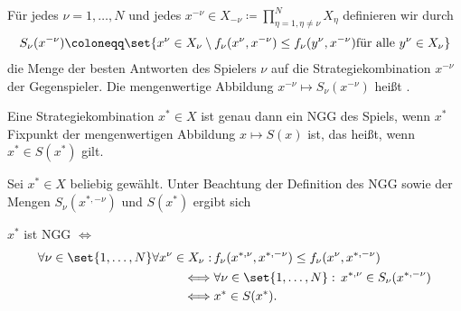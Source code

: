 \begin{definition}
  Für jedes $\nu = 1, \dots, N$ und jedes $x^{-\nu} \in X_{-\nu}\coloneqq \prod_{\eta = 1, \eta \neq \nu}^{N} X_{\eta}$ definieren wir durch
  \begin{align*}
    S_{\nu}(x^{-\nu}) \coloneqq \set{x^{\nu}\in X_{\nu}\setminus f_{\nu}(x^{\nu}, x^{-\nu}) \leq f_{\nu}(y^{\nu}, x^{-\nu}) \text{für alle } y^{\nu} \in X_{\nu}} 
  \end{align*}
die Menge der besten Antworten des Spielers $\nu$ auf die Strategiekombination $x^{-\nu}$ der Gegenspieler. Die mengenwertige Abbildung $x^{-\nu}\mapsto S_{\nu}(x^{-\nu})$ heißt .
\end{definition}
\begin{satz}
  Eine Strategiekombination $x^{*} \in X$ ist genau dann ein NGG des Spiels, wenn $x^{*}$ Fixpunkt der mengenwertigen Abbildung $x \mapsto S(x)$ ist, das heißt, wenn $x^{*} \in S(x^{*})$ gilt. 
\end{satz}
  \begin{beweis}
Sei $x^{*} \in X$ beliebig gewählt. Unter Beachtung der Definition des NGG sowie der Mengen $S_{\nu}(x^{*, - \nu})$ und $S(x^{*})$ ergibt sich 

$x^{*}$ ist NGG $\iff$
\begin{align*}
  \forall \nu \in \set{1, \dots, N} \forall x^{\nu}\in X_{\nu}: \, &f_{\nu}(x^{*, \nu}, x^{*, -\nu})\leq f_{\nu}(x^{\nu}, x^{*, -\nu}) \\
\iff &\forall \nu \in \set{1, \dots, N}: \, x^{*, \nu}\in S_{\nu}(x^{*, -\nu}) \\
\iff &x^{*} \in S(x^{*}).
\end{align*}
\end{beweis}

